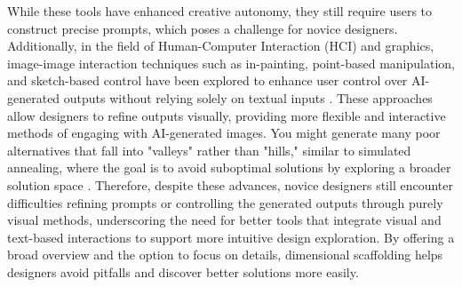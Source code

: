 While these tools have enhanced creative autonomy, they still require users to construct precise prompts, which poses a challenge for novice designers. Additionally, in the field of Human-Computer Interaction (HCI) and graphics, image-image interaction techniques such as in-painting, point-based manipulation, and sketch-based control have been explored to enhance user control over AI-generated outputs without relying solely on textual inputs \cite{iizuka2017globally, pan2023drag, zhang2023adding}. These approaches allow designers to refine outputs visually, providing more flexible and interactive methods of engaging with AI-generated images. You might generate many poor alternatives that fall into "valleys" rather than "hills," similar to simulated annealing, where the goal is to avoid suboptimal solutions by exploring a broader solution space \cite{ngoon2019dark}. Therefore, despite these advances, novice designers still encounter difficulties refining prompts or controlling the generated outputs through purely visual methods, underscoring the need for better tools that integrate visual and text-based interactions to support more intuitive design exploration. By offering a broad overview and the option to focus on details, dimensional scaffolding helps designers avoid pitfalls and discover better solutions more easily.

